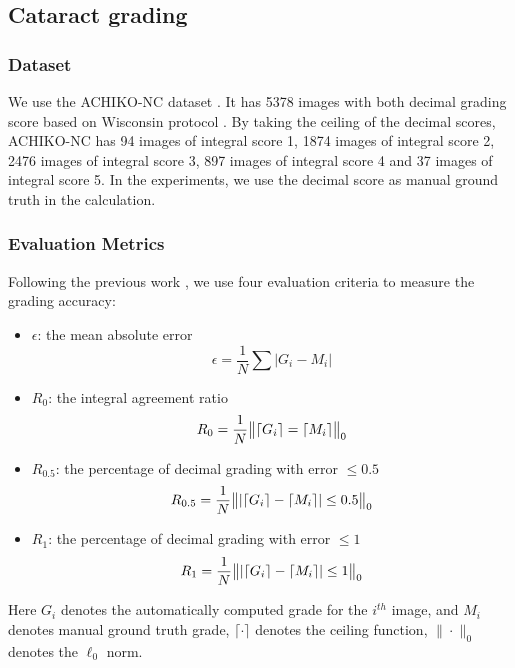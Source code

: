 \documentclass[journal]{IEEEtran}
\begin{document}
\subsection{Cataract grading}

\subsubsection{Dataset} We use the ACHIKO-NC dataset \cite{5415679}. It has 5378 images with both decimal  grading score  based on Wisconsin protocol \cite{Klein1990}. By taking the ceiling of the decimal scores,   ACHIKO-NC has 94 images of integral score 1, 1874 images of  integral score 2, 2476 images of  integral score 3, 897 images of  integral score 4 and 37 images of integral score 5. In the experiments, we use the decimal score as manual ground truth in the calculation. 
\subsubsection{Evaluation Metrics}
Following the previous work  \cite{5415679}, we use   four evaluation criteria   to measure the grading accuracy:
\begin{itemize} 
	\item $\epsilon$: the mean absolute error\begin{equation}
	\epsilon=\frac{1}{N} \sum |{G_i}-{M_i}|
	\end{equation}
	\item $R_0$: the integral agreement ratio \begin{equation}
	R_0= \frac{1}{N} \big{\|}\lceil{G_i}\rceil=\lceil{M_i}\rceil \big{\|}_0
	\end{equation}
	\item $R_{0.5}$: the percentage of decimal grading with error $\leq 0.5$ \begin{equation}
	R_{0.5}= \frac{1}{N} \big{\|}|\lceil{G_i}\rceil-\lceil{M_i}\rceil|\leq 0.5\big{\|}_0
	\end{equation}
	\item $R_{1}$: the percentage of decimal grading with error  $\leq 1$  \begin{equation}
	R_{1}= \frac{1}{N} \big{\|}|\lceil{G_i}\rceil-\lceil{M_i}\rceil|\leq 1\big{\|}_0
	\end{equation}
	
\end{itemize}
Here $G_i$  denotes the automatically computed grade for the $i^{th}$ image, and $M_i$  denotes manual ground truth grade, $\lceil \cdot \rceil$ denotes the ceiling function,   $\|\cdot\|_0$ denotes the $\ell_0$ norm. 
 
\end{document}
